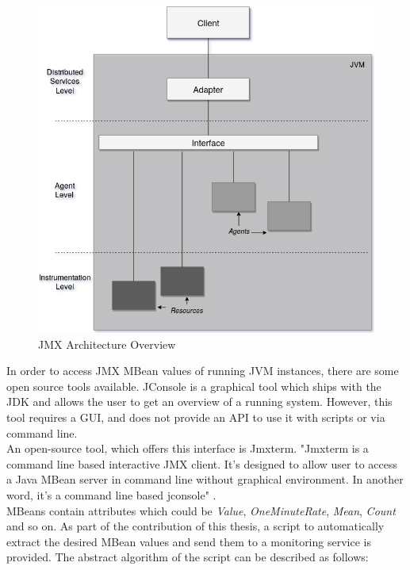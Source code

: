 \begin{figure}[!htbp]
  \centering
  \includegraphics[keepaspectratio=true,scale=0.45]{img/jmx}
    \caption{JMX Architecture Overview}
  \label{fig:jmx}
\end{figure}

In order to access JMX MBean values of running JVM instances, there are some open source tools available.
JConsole is a graphical tool which ships with the JDK and allows the user to get an overview of a running system.
However, this tool requires a GUI, and does not provide an API to use it with scripts or via command line.\\
An open-source tool, which offers this interface is Jmxterm.
"Jmxterm is a command line based interactive JMX client.
It's designed to allow user to access a Java MBean server in command line without graphical environment.
In another word, it's a command line based jconsole" \cite{jmxterm}.\\
MBeans contain attributes which could be \textit{Value}, \textit{OneMinuteRate}, \textit{Mean}, \textit{Count} and so on.
As part of the contribution of this thesis, a script to automatically extract the desired MBean values and send them to a monitoring service is provided.
The abstract algorithm of the script can be described as follows:

